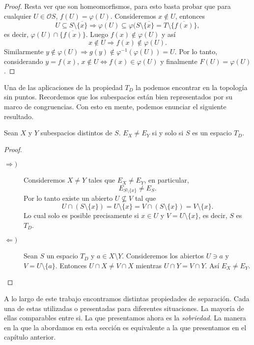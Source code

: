 \begin{proof}
    \noindent
    Resta ver que son homeomorfismos, para esto basta probar que para cualquier $U\in \mathcal{O}S$, $f(U)=\varphi(U)$. Consideremos $x\notin U$, entonces
    \[
    U\subseteq S\setminus \overline{\{x\}}\Rightarrow \varphi(U)\subseteq \varphi(S\setminus\overline{\{x\}}=T\setminus \overline{\{f(x)\}},
    \]
    es decir, $\varphi(U)\cap \overline{\{f(x)\}}$. Luego $f(x)\notin \varphi(U)$ y así 
    \[
    x\notin U \Rightarrow f(x)\notin \varphi (U).
    \]
    Similarmente $y\notin\varphi(U)\Rightarrow g(y)\notin \varphi^{-1}(\varphi(U))=U$. Por lo tanto, considerando $y=f(x)$, $x\notin U\Leftrightarrow f(x)\in \varphi(U)$ y finalmente $F(U)=\varphi(U)$.
    \end{proof}

Una de las aplicaciones de la propiedad $T_D$ la podemos encontrar en la topología sin puntos. Recordemos que los subespacios están bien representados por su marco de congruencias. Con esto en mente, podemos enunciar el siguiente resultado.

\begin{thm}
    Sean $X$ y $Y$ subespacios distintos de $S$. $E_X\neq E_Y$ si y solo si $S$ es un espacio $T_D$.
\end{thm}

\begin{proof}
    \begin{description}
        \item[$\Rightarrow )$] Consideremos $X\neq Y$ tales que $E_X\neq E_Y$, en particular, 
        \[
        E_{S\setminus \{x\}}\neq E_S.
        \]
        Por lo tanto existe un abierto $U\nsubseteq V$ tal que 
        \[
        U\cap (S\setminus \{x\})=U\setminus\{x\}=V\cap (S\setminus \{x\})=V\setminus\{x\}.
        \]
        Lo cual solo es posible precisamente si $x\in U$ y $V=U\setminus \{x\}$, es decir, $S$ es $T_D$.
        \item[$\Leftarrow )$] Sean $S$ un espacio $T_D$ y $a\in X\setminus Y$. Consideremos los abiertos $U\ni a$ y $V=U\setminus\{a\}$. Entonces $U\cap X\neq V\cap X$ mientras $U\cap Y=V\cap Y$. Así $E_X\neq E_Y$. 
    \end{description}
\end{proof}

A lo largo de este trabajo encontramos distintas propiedades de separación. Cada una de estas utilizadas o presentadas para diferentes situaciones. La mayoría de ellas comparables entre si. La que presentamos ahora es la \emph{sobriedad}. La manera en la que la abordamos en esta sección es equivalente a la que presentamos en el capítulo anterior.\\

